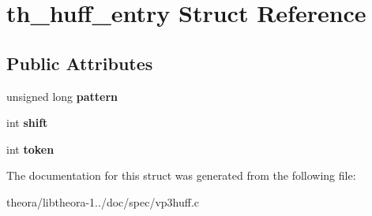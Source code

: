 \hypertarget{structth__huff__entry}{\section{th\+\_\+huff\+\_\+entry Struct Reference}
\label{structth__huff__entry}
}
\subsection*{Public Attributes}
\begin{DoxyCompactItemize}
\item 
\hypertarget{structth__huff__entry_a05755750a545f23043c23b019b65d099}{unsigned long {\bfseries pattern}}\label{structth__huff__entry_a05755750a545f23043c23b019b65d099}

\item 
\hypertarget{structth__huff__entry_a61ad4e3abd14cfe3aa235268f63f900a}{int {\bfseries shift}}\label{structth__huff__entry_a61ad4e3abd14cfe3aa235268f63f900a}

\item 
\hypertarget{structth__huff__entry_aeaf88f8bd0d1d1a1280d8266619c9ec8}{int {\bfseries token}}\label{structth__huff__entry_aeaf88f8bd0d1d1a1280d8266619c9ec8}

\end{DoxyCompactItemize}


The documentation for this struct was generated from the following file\+:\begin{DoxyCompactItemize}
\item 
theora/libtheora-\/1../doc/spec/vp3huff.\+c\end{DoxyCompactItemize}
